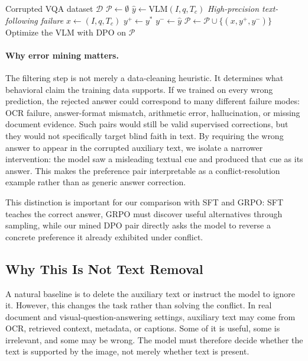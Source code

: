 \begin{algorithm}[t]
\caption{Automatic Text-Following Error Mining and DPO Pair Generation}
\label{alg:tf_dpo}
\small
\begin{algorithmic}[1]
\Require Corrupted VQA dataset $\mathcal{D}$
\State $\mathcal{P} \leftarrow \emptyset$
    \State $\hat{y} \leftarrow \mathrm{VLM}(I,q,T_c)$
        \Statex \hspace{\algorithmicindent}\textit{High-precision text-following failure}
        \State $x \leftarrow (I,q,T_c)$
        \State $y^+ \leftarrow y^*$
        \State $y^- \leftarrow \hat{y}$
        \State $\mathcal{P} \leftarrow \mathcal{P} \cup \{(x,y^+,y^-)\}$
    \EndIf
\EndFor
\State Optimize the VLM with DPO on $\mathcal{P}$
\end{algorithmic}
\end{algorithm}

\paragraph{Why error mining matters.}
The filtering step is not merely a data-cleaning heuristic.
It determines what behavioral claim the training data supports.
If we trained on every wrong prediction, the rejected answer could correspond to many different failure modes: OCR failure, answer-format mismatch, arithmetic error, hallucination, or missing document evidence.
Such pairs would still be valid supervised corrections, but they would not specifically target blind faith in text.
By requiring the wrong answer to appear in the corrupted auxiliary text, we isolate a narrower intervention:
the model saw a misleading textual cue and produced that cue as its answer.
This makes the preference pair interpretable as a conflict-resolution example rather than as generic answer correction.

This distinction is important for our comparison with SFT and GRPO:
SFT teaches the correct answer, GRPO must discover useful alternatives through sampling, while our mined DPO pair directly asks the model to reverse a concrete preference it already exhibited under conflict.

\subsection{Why This Is Not Text Removal}

A natural baseline is to delete the auxiliary text or instruct the model to ignore it.
However, this changes the task rather than solving the conflict.
In real document and visual-question-answering settings, auxiliary text may come from OCR, retrieved context, metadata, or captions.
Some of it is useful, some is irrelevant, and some may be wrong.
The model must therefore decide whether the text is supported by the image, not merely whether text is present.

